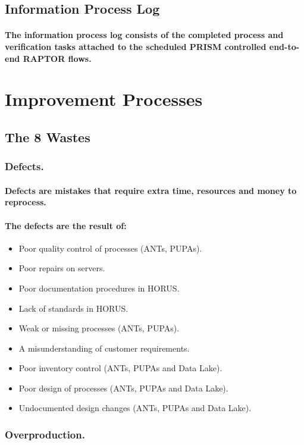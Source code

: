 \documentclass{acm_proc_article-sp}
\begin{document}
\subsection{Information Process Log}
\paragraph{The information process log consists of the completed process and verification tasks attached to the scheduled PRISM controlled end-to-end RAPTOR flows.}
\pagebreak
\section{Improvement Processes}
\subsection{The 8 Wastes}
\subsubsection{Defects.}
\paragraph{Defects are mistakes that require extra time, resources and money to reprocess.}
\paragraph{The defects are the result of:}
\begin{itemize}
\item Poor quality control of processes (ANTs, PUPAs).
\item Poor repairs on servers.
\item Poor documentation procedures in HORUS.
\item Lack of standards in HORUS.
\item Weak or missing processes (ANTs, PUPAs).
\item A misunderstanding of customer requirements.
\item Poor inventory control (ANTs, PUPAs and Data Lake).
\item Poor design of processes (ANTs, PUPAs and Data Lake).
\item Undocumented design changes (ANTs, PUPAs and Data Lake).
\end{itemize}
\subsubsection{Overproduction.}
\end{document}
